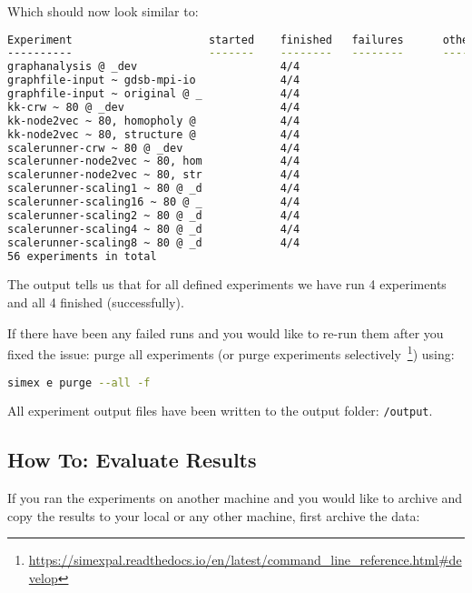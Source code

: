 \documentclass[11pt, a4paper]{scrartcl}
\begin{document}
Which should now look similar to:

\begin{lstlisting}[language=bash]
Experiment                     started    finished   failures      other
----------                     -------    --------   --------      -----
graphanalysis @ _dev                      4/4                             
graphfile-input ~ gdsb-mpi-io             4/4                             
graphfile-input ~ original @ _            4/4                             
kk-crw ~ 80 @ _dev                        4/4                             
kk-node2vec ~ 80, homopholy @             4/4                             
kk-node2vec ~ 80, structure @             4/4                             
scalerunner-crw ~ 80 @ _dev               4/4                             
scalerunner-node2vec ~ 80, hom            4/4                             
scalerunner-node2vec ~ 80, str            4/4                             
scalerunner-scaling1 ~ 80 @ _d            4/4                             
scalerunner-scaling16 ~ 80 @ _            4/4                             
scalerunner-scaling2 ~ 80 @ _d            4/4                             
scalerunner-scaling4 ~ 80 @ _d            4/4                             
scalerunner-scaling8 ~ 80 @ _d            4/4                             
56 experiments in total
\end{lstlisting}

The output tells us that for all defined experiments we have run 4 experiments
and all 4 finished (successfully).

If there have been any failed runs and you would like to re-run them after you
fixed the issue: purge all experiments (or purge experiments
selectively~\footnote{\url{https://simexpal.readthedocs.io/en/latest/command\_line\_reference.html\#develop}})
using:

\begin{lstlisting}[language=bash]
simex e purge --all -f
\end{lstlisting}

All experiment output files have been written to the output folder: \texttt{/output}.

\subsection{How To: Evaluate Results}\label{sec:getting_started:eval_results}

If you ran the experiments on another machine and you would like to archive and
copy the results to your local or any other machine, first archive the data:
\end{document}
